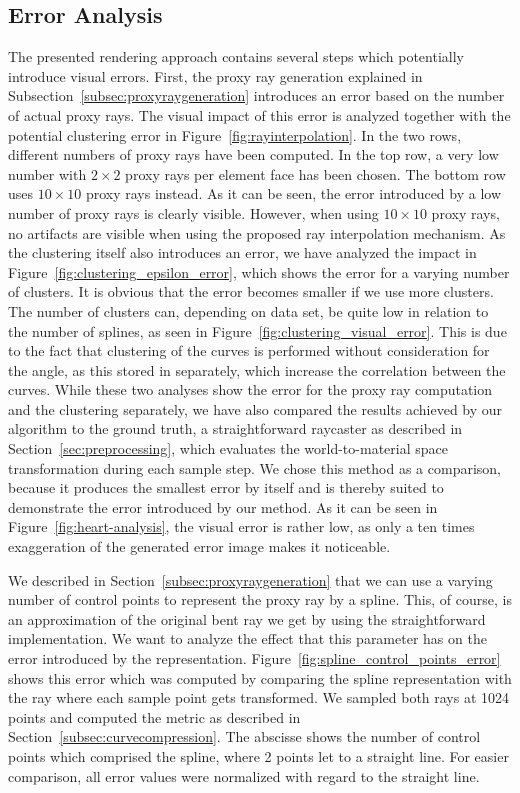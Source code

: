 \documentclass[journal]{vgtc}                %
\begin{document}
\subsection{Error Analysis}\label{subsec:error}
The presented rendering approach contains several steps which potentially introduce visual errors. First, the proxy ray generation explained in Subsection~\ref{subsec:proxyraygeneration} introduces an error based on the number of actual proxy rays. The visual impact of this error is analyzed together with the potential clustering error in Figure~\ref{fig:rayinterpolation}. In the two rows, different numbers of proxy rays have been computed. In the top row, a very low number with $2 \times 2$ proxy rays per element face has been chosen. The bottom row uses $10 \times 10$ proxy rays instead. As it can be seen, the error introduced by a low number of proxy rays is clearly visible. However, when using $10 \times 10$ proxy rays, no artifacts are visible when using the proposed ray interpolation mechanism. As the clustering itself also introduces an error, we have analyzed the impact in Figure~\ref{fig:clustering_epsilon_error}, which shows the error for a varying number of clusters. It is obvious that the error becomes smaller if we use more clusters. The number of clusters can, depending on data set, be quite low in relation to the number of splines, as seen in Figure~\ref{fig:clustering_visual_error}. This is due to the fact that clustering of the curves is performed without consideration for the angle, as this stored in separately, which increase the correlation between the curves. While these two analyses show the error for the proxy ray computation and the clustering separately, we have also compared the results achieved by our algorithm to the ground truth, a straightforward raycaster as described in Section~\ref{sec:preprocessing}, which evaluates the world-to-material space transformation during each sample step. We chose this method as a comparison, because it produces the smallest error by itself and is thereby suited to demonstrate the error introduced by our method. As it can be seen in Figure~\ref{fig:heart-analysis}, the visual error is rather low, as only a ten times exaggeration of the generated error image makes it noticeable.

We described in Section~\ref{subsec:proxyraygeneration} that we can use a varying number of control points to represent the proxy ray by a spline. This, of course, is an approximation of the original bent ray we get by using the straightforward implementation. We want to analyze the effect that this parameter has on the error introduced by the representation. Figure~\ref{fig:spline_control_points_error} shows this error which was computed by comparing the spline representation with the ray where each sample point gets transformed. We sampled both rays at 1024 points and computed the metric as described in Section~\ref{subsec:curvecompression}. The abscisse shows the number of control points which comprised the spline, where 2 points let to a straight line. For easier comparison, all error values were normalized with regard to the straight line.
\end{document}
